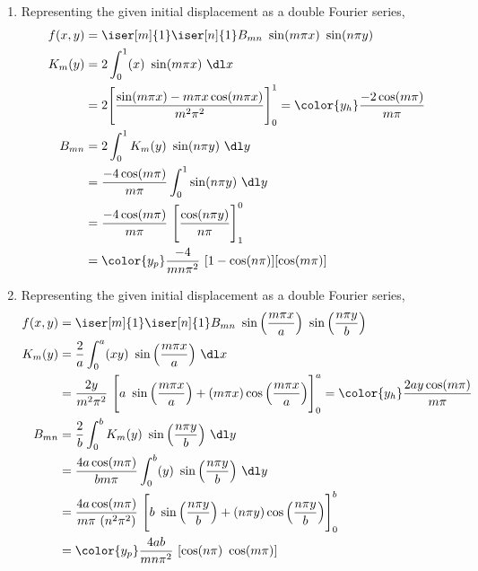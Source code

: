 \begin{enumerate}
    \item Representing the given initial displacement as a double Fourier series,
          \begin{align}
              f(x, y) & = \iser[m]{1} \iser[n]{1} B_{mn}\ \sin(m\pi x)
              \ \sin(n \pi y)                                               \\
              K_m(y)  & = 2 \int_{0}^{1} (x)\ \sin(m\pi x)\ \dl x           \\
                      & = 2\Bigg[ \frac{\sin(m\pi x) - m\pi x \cos(m\pi x)}
                  {m^2 \pi^2} \Bigg]_0^1
              = \color{y_h} \frac{-2\cos(m\pi)}{m\pi}                       \\
              B_{mn}  & = 2 \int_{0}^{1} K_m(y)\ \sin(n\pi y)\ \dl y        \\
                      & = \frac{-4\cos(m\pi)}{m\pi}
              \int_{0}^{1} \sin(n\pi y)\ \dl y                              \\
                      & = \frac{-4\cos(m\pi)}{m\pi}
              \ \Bigg[ \frac{\cos(n\pi y)}{n\pi} \Bigg]_1^0                 \\
                      & = \color{y_p} \frac{-4}{mn\pi^2}
              \ [1 - \cos(n\pi)][\cos(m\pi)]
          \end{align}

    \item Representing the given initial displacement as a double Fourier series,
          \begin{align}
              f(x, y) & = \iser[m]{1} \iser[n]{1} B_{mn}\ \sin\Big( \frac{m\pi x }{a}
              \Big)\ \sin\Big( \frac{n\pi y }{b}\Big)                                 \\
              K_m(y)  & = \frac{2}{a} \int_{0}^{a} (xy)\ \sin\Big( \frac{m\pi x }{a}
              \Big)\ \dl x                                                            \\
                      & = \frac{2y}{m^2 \pi^2}\ \Bigg[ a\ \sin\Big( \frac{m\pi x }{a}
                  \Big) + (m\pi x) \cos\Big( \frac{m\pi x }{a} \Big) \Bigg]_0^a
              = \color{y_h} \frac{2ay\cos(m\pi)}{m\pi}                                \\
              B_{mn}  & = \frac{2}{b} \int_{0}^{b} K_m(y)\ \sin\Big(\frac{n\pi y }{b}
              \Big)\ \dl y                                                            \\
                      & = \frac{4a\cos(m\pi)}{bm\pi}
              \int_{0}^{b} (y)\ \sin\Big( \frac{n\pi y }{b}\Big)\ \dl y               \\
                      & = \frac{4a\cos(m\pi)}{m\pi\ (n^2\pi^2)}
              \ \Bigg[ b\ \sin\Big( \frac{n\pi y }{b}
              \Big) + (n\pi y) \cos\Big( \frac{n\pi y }{b} \Big) \Bigg]_0^b           \\
                      & = \color{y_p} \frac{4ab}{mn\pi^2}
              \ [\cos(n\pi)\ \cos(m\pi)]
          \end{align}


\end{enumerate}
